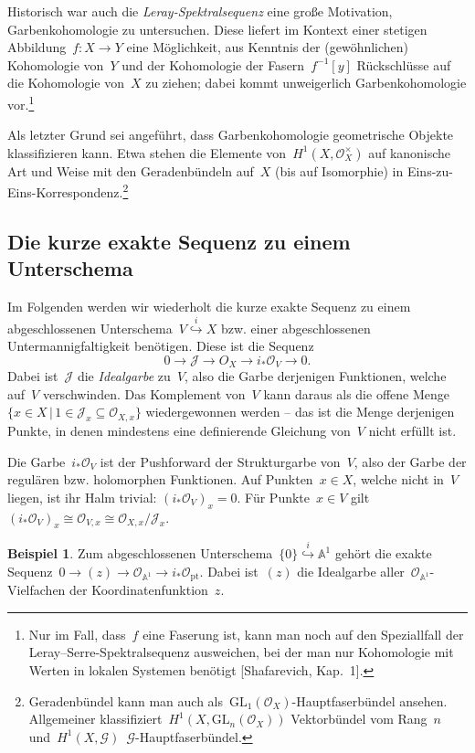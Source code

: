\documentclass[a4paper,ngerman,12pt]{scrartcl}
\theoremstyle{definition}
\newtheorem{ex}[defn]{Beispiel}
\theoremstyle{plain}
\theoremstyle{remark}
\renewcommand{\AA}{\mathbb{A}}
\newcommand{\G}{\mathcal{G}}
\newcommand{\J}{\mathcal{J}}
\renewcommand{\O}{\mathcal{O}}
\newcommand{\GL}{\mathrm{GL}}
\newcommand{\pt}{\mathrm{pt}}
\newcommand{\lra}{\longrightarrow}
\begin{document}
Historisch war auch die \emph{Leray-Spektralsequenz} eine große Motivation,
Garbenkohomologie zu untersuchen. Diese liefert im Kontext einer stetigen
Abbildung~$f : X \to Y$ eine Möglichkeit, aus Kenntnis der (gewöhnlichen)
Kohomologie von~$Y$ und der Kohomologie der Fasern~$f^{-1}[y]$ Rückschlüsse auf die Kohomologie
von~$X$ zu ziehen; dabei kommt unweigerlich Garbenkohomologie vor.\footnote{Nur
im Fall, dass~$f$ eine Faserung ist, kann man noch auf den Speziallfall der
Leray--Serre-Spek\-tral\-sequenz ausweichen, bei der man nur Kohomologie mit Werten
in lokalen Systemen benötigt [Shafarevich, Kap.~1].}

Als letzter Grund sei angeführt, dass Garbenkohomologie geometrische Objekte
klassifizieren kann. Etwa stehen die Elemente von~$H^1(X,\O_X^\times)$ auf
kanonische Art und Weise mit den Geradenbündeln auf~$X$ (bis auf Isomorphie) in
Eins-zu-Eins-Korrespondenz.\footnote{Geradenbündel kann man auch
als~$\GL_1(\O_X)$-Hauptfaserbündel ansehen. Allgemeiner
klassifiziert~$H^1(X,\GL_n(\O_X))$ Vektorbündel vom Rang~$n$
und~$H^1(X,\G)$~$\G$-Hauptfaserbündel.}


\subsection*{Die kurze exakte Sequenz zu einem Unterschema}

Im Folgenden werden wir wiederholt die kurze exakte Sequenz zu einem
abgeschlossenen Unterschema~$V \stackrel{i}{\hookrightarrow} X$ bzw. einer
abgeschlossenen Untermannigfaltigkeit benötigen. Diese ist die Sequenz
\[ 0 \lra \J \lra O_X \lra i_*\O_V \lra 0. \]
Dabei ist~$\J$ die \emph{Idealgarbe} zu~$V$, also die Garbe derjenigen
Funktionen, welche auf~$V$ verschwinden. Das Komplement von~$V$ kann daraus als
die offene Menge~$\{ x \in X \,|\, 1 \in \J_x \subseteq \O_{X,x} \}$
wiedergewonnen werden -- das ist die Menge derjenigen Punkte, in denen
mindestens eine definierende Gleichung von~$V$ nicht erfüllt ist.

Die Garbe~$i_* \O_V$ ist der Pushforward der Strukturgarbe von~$V$, also der
Garbe der regulären bzw. holomorphen Funktionen. Auf Punkten~$x \in X$, welche
nicht in~$V$ liegen, ist ihr Halm trivial: $(i_*\O_V)_x = 0$. Für Punkte~$x \in
V$ gilt~$(i_*\O_V)_x \cong \O_{V,x} \cong \O_{X,x}/\J_x$.

\begin{ex}Zum abgeschlossenen Unterschema~$\{0\} \stackrel{i}{\hookrightarrow} \AA^1$ gehört
die exakte Sequenz~$0 \to (z) \to \O_{\AA^1} \to i_*\O_\pt$. Dabei ist~$(z)$ die
Idealgarbe aller~$\O_{\AA^1}$-Vielfachen der Koordinatenfunktion~$z$.\end{ex}
\end{document}
